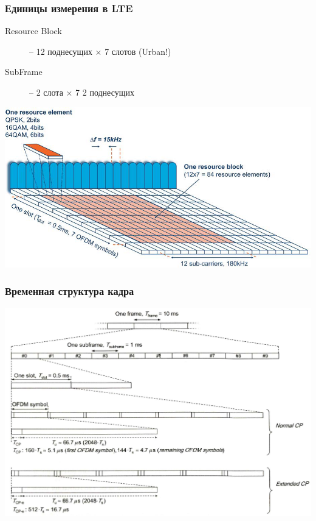 \documentclass[utf8]{beamer}
\begin{document}
\begin{frame}
\frametitle{Единицы измерения в LTE}
\begin{description}
\item[Resource Block] -- 12 поднесущих $\times$ 7 слотов (Urban!)
\item[SubFrame] -- 2 слота  $\times$ 7 2 поднесущих
\end{description}
\begin{center}
\includegraphics[width=\textwidth]{pic/rb-re.png}
\end{center}
\end{frame}
\begin{frame}
\frametitle{Временная структура кадра}
\centering
\includegraphics[width=\textwidth]{pic/time-domain.png}
\end{frame}
\end{document}
